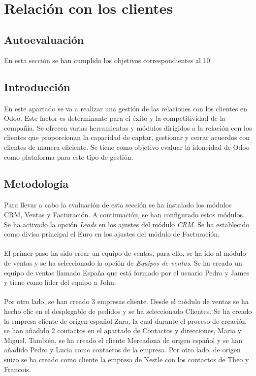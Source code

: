 \section{Relación con los clientes}
\subsection{Autoevaluación}
En esta sección se han cumplido los objetivos correspondientes al 10.
\subsection{Introducción}
\paragraph{}
En este apartado se va a realizar una gestión de las relaciones con los clientes en Odoo. Este factor es determinante para el éxito y la competitividad de la compañía. Se ofrecen varias herramientas y módulos dirigidos a la relación con los clientes que proporcionan la capacidad de captar, gestionar y cerrar acuerdos con clientes de manera eficiente. Se tiene como objetivo evaluar la idoneidad de Odoo como plataforma para este tipo de gestión.
\subsection{Metodología}
\paragraph{}
Para llevar a cabo la evaluación de esta sección se ha instalado los módulos CRM, Ventas y Facturación. A continuación, se han configurado estos módulos. Se ha activado la opción \textit{Leads} en los ajustes del módulo \textit{CRM}. Se ha establecido como divisa principal el Euro en los ajustes del módulo de Facturación.
\paragraph{}
El primer paso ha sido crear un equipo de ventas, para ello, se ha ido al módulo de ventas y se ha seleccionado la opción de \textit{Equipos de ventas}. Se ha creado un equipo de ventas llamado España que está formado por el usuario Pedro y James y tiene como líder del equipo a John. 
\paragraph{}
Por otro lado, se han creado 3 empresas cliente. Desde el módulo de ventas se ha hecho clic en el desplegable de pedidos y se ha seleccionado Clientes. Se ha creado la empresa cliente de origen español Zara, la cual durante el proceso de creación se han añadido 2 contactos en el apartado de Contactos y direcciones, Maria y Miguel. También, se ha creado el cliente Mercadona de origen español y se han añadido Pedro y Lucia como contactos de la empresa. Por otro lado, de origen suizo se ha creado como cliente la empresa de Nestle con los contactos de Theo y Francois. 
